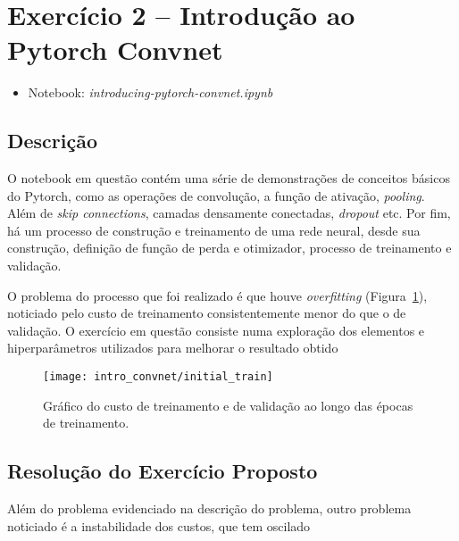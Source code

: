 \section{Exercício 2 -- Introdução ao Pytorch Convnet}

\begin{itemize}
	\item Notebook: \textit{introducing-pytorch-convnet.ipynb}
\end{itemize}

\subsection{Descrição}

O notebook em questão contém uma série de demonstrações de conceitos básicos do Pytorch, como as operações de convolução, a função de ativação, \textit{pooling}. Além de \textit{skip connections}, camadas densamente conectadas, \textit{dropout} etc. Por fim, há um processo de construção e treinamento de uma rede neural, desde sua construção, definição de função de perda e otimizador, processo de treinamento e validação.

O problema do processo que foi realizado é que houve \textit{overfitting} (Figura~\ref{fig:note2:init_train}), noticiado pelo custo de treinamento consistentemente menor do que o de validação. O exercício em questão consiste numa exploração dos elementos e hiperparâmetros utilizados para melhorar o resultado obtido

\begin{figure}[!htb]
	\centering
	\texttt{[image: intro\_convnet/initial\_train]}
	\caption{Gráfico do custo de treinamento e de validação ao longo das épocas de treinamento.}
	\label{fig:note2:init_train}
\end{figure}

\subsection{Resolução do Exercício Proposto}

Além do problema evidenciado na descrição do problema, outro problema noticiado é a instabilidade dos custos, que tem oscilado 